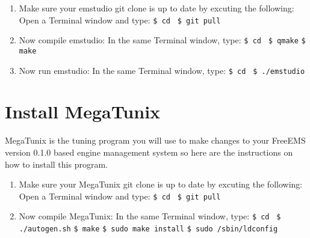 \documentclass[12pt,notitlepage,onecolumn,oneside,openany]{memoir}
\begin{document}
\begin{enumerate}
\item \textsf{Make sure your emstudio git clone is up to date by excuting the following:} \newline
      \textsf{Open a Terminal window and type:} \newline
      \texttt{\$ cd }  \newline
      \texttt{\$ git pull}

\item \textsf{Now compile emstudio:} \newline
      \textsf{In the same Terminal window, type:} \newline
      \texttt{\$ cd }  \newline
      \texttt{\$ qmake} \newline
      \texttt{\$ make} \newline

\item \textsf{Now run emstudio:} \newline
      \textsf{In the same Terminal window, type:} \newline
      \texttt{\$ cd }  \newline
      \texttt{\$ ./emstudio} \newline      
\end{enumerate}

\chapter{\textsf{Install MegaTunix}}

\textsf{MegaTunix is the tuning program you will use to make changes to your FreeEMS version 0.1.0 based engine management system so here are the instructions on how to install this program.} \newline

\begin{enumerate}
\item \textsf{Make sure your MegaTunix git clone is up to date by excuting the following:} \newline
      \textsf{Open a Terminal window and type:} \newline
      \texttt{\$ cd }  \newline
      \texttt{\$ git pull}

\item \textsf{Now compile MegaTunix:} \newline
      \textsf{In the same Terminal window, type:} \newline
      \texttt{\$ cd }  \newline
      \texttt{\$ ./autogen.sh} \newline
      \texttt{\$ make} \newline
      \texttt{\$ sudo make install} \newline
      \texttt{\$ sudo /sbin/ldconfig} \newline
\end{enumerate}
\end{document}
